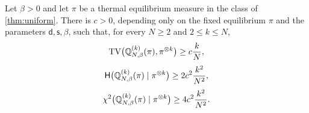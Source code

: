 \documentclass[11pt,reqno]{amsart}
\numberwithin{equation}{section}
\theoremstyle{plain}
\theoremstyle{remark}
\renewcommand{\d}{\mathsf{d}}\newcommand{\s}{\mathsf{s}}
\newcommand{\Hr}{\mathsf H}\newcommand{\dd}{\,\mathrm d}
\begin{document}
\begin{prop}\label{prop:stationary-sharpness}
Let $\beta>0$ and let $\pi$ be a thermal equilibrium measure in the class of \cref{thm:uniform}. There is $c>0$, depending only on the fixed equilibrium $\pi$ and the parameters $\d,\s,\beta$, such that, for every $N\ge2$ and $2\le k\le N$,
\begin{equation}\label{eq:stationary-TV-lower}
 \operatorname{TV}\bigl(\mathbb Q_{N,\beta}^{(k)}(\pi),\pi^{\otimes k}\bigr)\ge c\frac{k}{N},
\end{equation}
\begin{equation}\label{eq:stationary-entropy-lower}
 \Hr\bigl(\Q_{N,\beta}^{(k)}(\pi)\mid\pi^{\otimes k}\bigr)\ge2c^2\frac{k^2}{N^2},
\end{equation}
\begin{equation}\label{eq:stationary-chi-lower}
 \chi^2\bigl(\mathbb Q_{N,\beta}^{(k)}(\pi)\mid\pi^{\otimes k}\bigr)\ge4c^2\frac{k^2}{N^2}.
\end{equation}
\end{prop}
\end{document}
